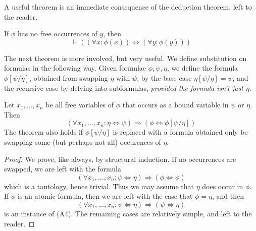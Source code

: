 A useful theorem is an immediate consequence of the deduction theorem, left to the reader.

\begin{theorem}
    If $\phi$ has no free occurrences of $y$, then
    \[ \vdash ((\forall x: \phi(x)) \Leftrightarrow (\forall y: \phi(y))) \]
\end{theorem}

The next theorem is more involved, but very useful. We define substitution on formulas in the following way. Given formulae $\phi,\psi,\eta$, we define the formula $\phi[\psi/\eta]$, obtained from swapping $\eta$ with $\psi$, by the base case $\eta[\psi/\eta] = \psi$, and the recursive case by delving into subformulas, {\it provided the formula isn't just $\eta$}.

\begin{theorem}
    Let $x_1, \dots, x_n$ be all free variables of $\phi$ that occurs as a bound variable in $\psi$ or $\eta$. Then
    \[ (\forall x_1, \dots, x_n: \eta \Leftrightarrow \psi) \Rightarrow (\phi \Leftrightarrow \phi[\psi/\eta]) \]
    The theorem also holds if $\phi[\psi/\eta]$ is replaced with a formula obtained only be swapping some (but perhaps not all) occurences of $\eta$.
\end{theorem}
\begin{proof}
    We prove, like always, by structural induction. If no occurrences are swapped, we are left with the formula
    \[ (\forall x_1, \dots, x_n: \psi \Leftrightarrow \eta) \Rightarrow (\phi \Leftrightarrow \phi) \]
    which is a tautology, hence trivial. Thus we may assume that $\eta$ does occur in $\phi$. If $\phi$ is an atomic formula, then we are left with the case that $\phi = \eta$, and then
    \[ (\forall x_1, \dots, x_n: \psi \Leftrightarrow \eta) \Rightarrow (\psi \Leftrightarrow \eta) \]
    is an instance of (A4). The remaining cases are relatively simple, and left to the reader.
\end{proof}

